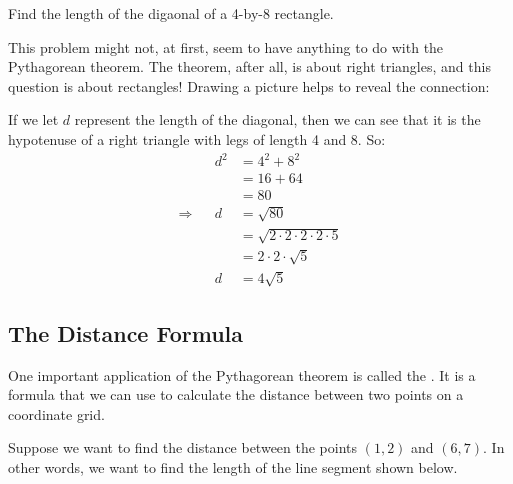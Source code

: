 \begin{boxedex}
Find the length of the digaonal of a 4-by-8 rectangle.

\bigskip{} This problem might not, at first, seem to have anything to do with the Pythagorean theorem. The theorem, after all, is about right triangles, and this question is about rectangles! Drawing a picture helps to reveal the connection:

\begin{center}\end{center}

If we let $d$ represent the length of the diagonal, then we can see that it is the hypotenuse of a right triangle with legs of length 4 and 8. So:
\[\begin{aligned}
&& 				d^2	&= 4^2 + 8^2\\
&&					&= 16 + 64\\
&&					&= 80\\
\Rightarrow	&& 	d 	&= \sqrt{80}\\
			&&		&= \sqrt{2 \cdot 2 \cdot 2 \cdot 2 \cdot 5}\\
			&&		&= 2 \cdot 2 \cdot \sqrt{5}\\
			&& d 	&= 4\sqrt{5}
\end{aligned}\]
\end{boxedex}


\subsection{The Distance Formula}

One important application of the Pythagorean theorem is called the . It is a formula that we can use to calculate the distance between two points on a coordinate grid.

Suppose we want to find the distance between the points $(1,2)$ and $(6,7)$. In other words, we want to find the length of the line segment shown below.

\begin{center}
\end{center}

